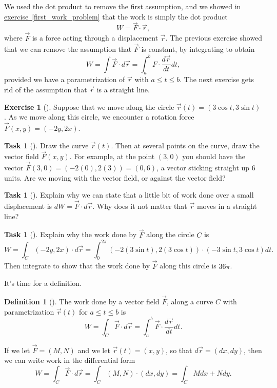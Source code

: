 \documentclass[10pt,]{book}
\theoremstyle{plain}
\theoremstyle{definition}
\newtheorem{definition}[theorem]{Definition}
\theoremstyle{definition}
\theoremstyle{definition}
\theoremstyle{definition}
\newtheorem{exploration}[project]{Exercise}
\newtheorem{task}[project]{Task}
\theoremstyle{definition}
\numberwithin{equation}{section}
\begin{document}
We used the dot product to remove the first assumption, and we showed in \hyperref[first_work_problem]{exercise~\ref{first_work_problem}} that the work is simply the dot product%
\begin{equation*}
W=\vec F\cdot \vec r,
\end{equation*}
where \(\vec F\) is a force acting through a displacement \(\vec r\). The previous exercise showed that we can remove the assumption that \(\vec F\) is constant, by integrating to obtain%
\begin{equation*}
W=\int \vec F \cdot d\vec r = \int_a^b F\cdot \frac{d\vec r}{dt}dt,
\end{equation*}
provided we have a parametrization of \(\vec r\) with \(a\leq t\leq b\). The next exercise gets rid of the assumption that \(\vec r\) is a straight line.%
\begin{exploration}[]\label{exploration-191}
Suppose that we move along the circle \(\vec r(t) = (3\cos t,3\sin t)\). As we move along this circle, we encounter a rotation force \(\vec F(x,y) = (-2y,2x)\).%
\begin{task}[]\label{task-471}
Draw the curve \(\vec r(t)\). Then at several points on the curve, draw the vector field \(\vec F(x,y)\).  For example, at the point \((3,0)\) you should have the vector \(\vec F(3,0)=(-2(0),2(3))=(0,6)\), a vector sticking straight up 6 units. Are we moving with the vector field, or against the vector field?%
\end{task}
\begin{task}[]\label{task-472}
Explain why we can state that a little bit of work done over a small displacement is \(dW = \vec F\cdot d\vec r\). Why does it not matter that \(\vec r\) moves in a straight line?%
\end{task}
\begin{task}[]\label{task-473}
Explain why the work done by \(\vec F\) along the circle \(C\)  is%
\begin{equation*}
W = \int_C\left(-2y,2x\right)\cdot d\vec r
= \int_0^{2\pi}\left(-2(3\sin t),2(3\cos t)\right)\cdot(-3\sin t, 3\cos t)dt.
\end{equation*}
Then integrate to show that the work done by \(\vec F\) along this circle is \(36\pi\).%
\end{task}
\end{exploration}
It's time for a definition.%
\begin{definition}[{}]\label{definition-32}
The work done by a vector field \(\vec F\), along a curve \(C\) with parametrization \(\vec r(t)\) for \(a\leq t\leq b\) is%
\begin{equation*}
W = \int_C \vec F\cdot d\vec r= \int_a^b \vec F\cdot \frac{d\vec r}{dt}dt.
\end{equation*}
%
\par
If we let \(\vec F = (M,N)\) and we let \(\vec r(t)=(x,y)\), so that \(d\vec r = (dx,dy)\), then we can write work in the differential form%
\begin{equation*}
W = \int_C \vec F\cdot d\vec r= \int_C (M,N)\cdot (dx,dy) = \int_C Mdx+Ndy.
\end{equation*}
%
\end{definition}
\end{document}
